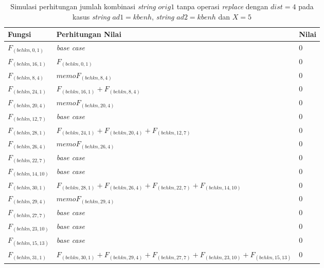 \begin{appendices}
  
  \begin{table}[H]
  	\centering
  	\begin{tabular} {|p{3cm}|p{5cm}|p{1cm}|} \hline
  		Fungsi & Perhitungan Nilai & Nilai \\ \hline
  		$ F_{(behkn, 0, 1)} $ & \textit{base case} & $ 0 $ \\ \hline
  		$ F_{(behkn, 16, 1)}  $ & $F_{(behkn, 0, 1)}$ & $ 0 $ \\ \hline
  		$ F_{(behkn, 8, 4)}  $ & $memoF_{(behkn, 8, 4)}$ & $ 0 $ \\ \hline
  		$ F_{(behkn, 24, 1)}  $ & $F_{(behkn, 16, 1)} + F_{(behkn, 8, 4)}$ & $ 0 $ \\ \hline
  		$ F_{(behkn, 20, 4)}  $ & $memoF_{(behkn, 20, 4)}$ & $ 0 $ \\ \hline
  		$ F_{(behkn, 12, 7)} $ & \textit{base case} & $ 0 $ \\ \hline
  		$ F_{(behkn, 28, 1)}  $ & $F_{(behkn, 24, 1)} + F_{(behkn, 20, 4)} + F_{(behkn, 12, 7)}$ & $ 0 $ \\ \hline
  		$ F_{(behkn, 26, 4)}  $ & $memoF_{(behkn, 26, 4)}$ & $ 0 $ \\ \hline
  		$ F_{(behkn, 22, 7)} $ & \textit{base case} & $ 0 $ \\ \hline
  		$ F_{(behkn, 14, 10)} $ & \textit{base case} & $ 0 $ \\ \hline
  		$ F_{(behkn, 30, 1)}  $ & $F_{(behkn, 28, 1)} + F_{(behkn, 26, 4)} + F_{(behkn, 22, 7)} + F_{(behkn, 14, 10)}$ & $ 0 $ \\ \hline
  		$ F_{(behkn, 29, 4)}  $ & $memoF_{(behkn, 29, 4)}$ & $ 0 $ \\ \hline
  		$ F_{(behkn, 27, 7)} $ & \textit{base case} & $ 0 $ \\ \hline
  		$ F_{(behkn, 23, 10)} $ & \textit{base case} & $ 0 $ \\ \hline
  		$ F_{(behkn, 15, 13)} $ & \textit{base case} & $ 0 $ \\ \hline
  		\rowcolor{LightCyan}
  		$ F_{(behkn, 31, 1)}  $ & $F_{(behkn, 30, 1)} + F_{(behkn, 29, 4)} + F_{(behkn, 27, 7)} + F_{(behkn, 23, 10)} + F_{(behkn, 15, 13)}$ & $ 0 $ \\ \hline
  	\end{tabular}\caption{Simulasi perhitungan jumlah kombinasi \textit{string} $ orig1 $ tanpa operasi \textit{replace} dengan $ dist= 4  $ pada kasus \textit{string} $ ad1=kbenh $, \textit{string} $ ad2=kbenh $ dan $ X=5 $}
  	\label{tab:f_3_orig1_4_1}
  \end{table}
  

\end{appendices}
